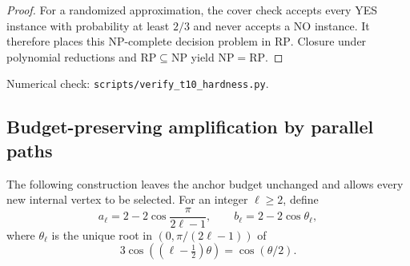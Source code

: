 \documentclass[11pt]{article}
\begin{document}
\begin{proof}
For a randomized approximation, the cover check accepts every
YES instance with probability at least $2/3$ and never accepts a
NO instance. It therefore places this NP-complete decision problem
in $\mathrm{RP}$. Closure under polynomial reductions and
$\mathrm{RP}\subseteq\mathrm{NP}$ yield
$\mathrm{NP}=\mathrm{RP}$.
\end{proof}
\noindent Numerical check: \texttt{scripts/verify\_t10\_hardness.py}.

\subsection{Budget-preserving amplification by parallel paths}
The following construction leaves the anchor budget unchanged and
allows every new internal vertex to be selected. For an integer
$\ell\geq2$, define
\begin{equation}\label{eq:pathconstants}
 a_\ell=2-2\cos\frac{\pi}{2\ell-1},\qquad
 b_\ell=2-2\cos\theta_\ell,
\end{equation}
where $\theta_\ell$ is the unique root in
$(0,\pi/(2\ell-1))$ of
\begin{equation}\label{eq:pathroot}
 3\cos((\ell-\tfrac12)\theta)=\cos(\theta/2).
\end{equation}
\end{document}
